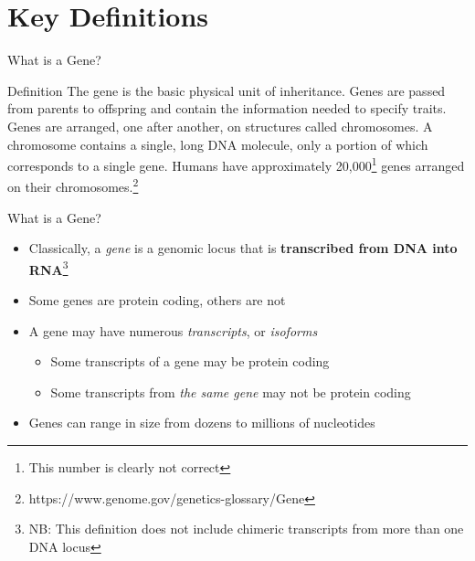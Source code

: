\documentclass[aspectratio=169,11pt]{beamer}
\begin{document}
\section{Key Definitions}


\begin{frame}{What is a Gene?}

	\begin{block}{Definition}
		The gene is the basic physical unit of inheritance. 
		Genes are passed from parents to offspring and contain the information needed to specify traits. 
		Genes are arranged, one after another, on structures called chromosomes. 
		A chromosome contains a single, long DNA molecule, only a portion of which corresponds to a single gene. 
		Humans have approximately 20,000\footnote{This number is clearly not correct} genes arranged on their chromosomes.\footnote{https://www.genome.gov/genetics-glossary/Gene}
	\end{block}
	
\end{frame}


\begin{frame}{What is a Gene?}

	\begin{itemize}
		\item Classically, a \textit{gene} is a genomic locus that is \textbf{transcribed from DNA into RNA}\footnote{NB: This definition does not include chimeric transcripts from more than one DNA locus}
		\item Some genes are protein coding, others are not
		\item A gene may have numerous \textit{transcripts}, or \textit{isoforms}
		
		\begin{itemize}
			\item Some transcripts of a gene may be protein coding
			\item Some transcripts from \textit{the same gene} may not be protein coding		
		\end{itemize}
		
	\item Genes can range in size from dozens to millions of nucleotides

	\end{itemize}
	
\end{frame}
\end{document}
